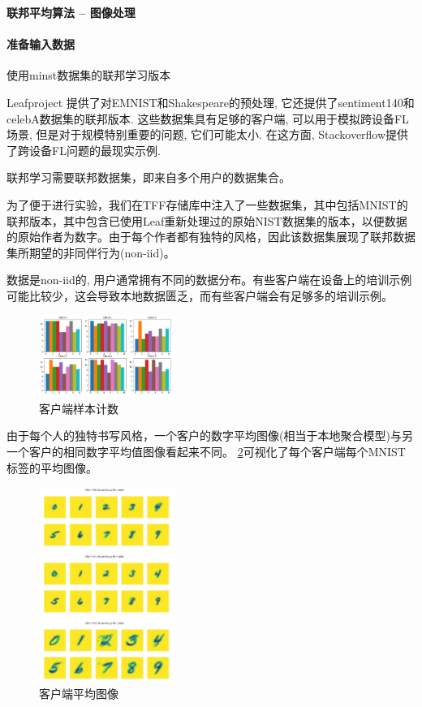 \textbf{联邦平均算法 -- 图像处理}

\paragraph{准备输入数据}

使用minst数据集的联邦学习版本

Leafproject  提供了对EMNIST和Shakespeare的预处理, 它还提供了sentiment140和celebA数据集的联邦版本. 这些数据集具有足够的客户端, 可以用于模拟跨设备FL场景, 但是对于规模特别重要的问题, 它们可能太小. 在这方面, Stackoverflow提供了跨设备FL问题的最现实示例.

 联邦学习需要联邦数据集，即来自多个用户的数据集合。 

为了便于进行实验，我们在TFF存储库中注入了一些数据集，其中包括MNIST的联邦版本，其中包含已使用Leaf重新处理过的原始NIST数据集的版本，以便数据的原始作者为数字。由于每个作者都有独特的风格，因此该数据集展现了联邦数据集所期望的非同伴行为(non-iid)。

数据是non-iid的, 用户通常拥有不同的数据分布。有些客户端在设备上的培训示例可能比较少，这会导致本地数据匮乏，而有些客户端会有足够多的培训示例。


\begin{figure}[!ht]
    \center
\includegraphics[width=0.4\textwidth]{figures/CDP/label_count.jpg}
\caption{客户端样本计数}
\label{fig:label_count}
\end{figure}
 由于每个人的独特书写风格，一个客户的数字平均图像(相当于本地聚合模型)与另一个客户的相同数字平均值图像看起来不同。
\ref{fig:mean_image}可视化了每个客户端每个MNIST标签的平均图像。
 
\begin{figure}[!ht]
    \center
\includegraphics[width=0.4\textwidth]{figures/CDP/Mean_image.jpg}
\caption{客户端平均图像}
\label{fig:mean_image}
\end{figure}


